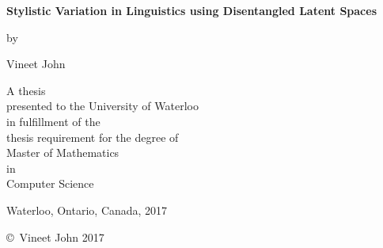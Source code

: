 \pagestyle{empty}

\begin{titlepage}
        \begin{center}
        \vspace*{1.0cm}

        \Huge
        {\bf Stylistic Variation in Linguistics using Disentangled Latent Spaces }

        \vspace*{1.0cm}

        \normalsize
        by \\

        \vspace*{1.0cm}

        \Large
        Vineet John \\

        \vspace*{3.0cm}

        \normalsize
        A thesis \\
        presented to the University of Waterloo \\ 
        in fulfillment of the \\
        thesis requirement for the degree of \\
        Master of Mathematics \\
        in \\
        Computer Science \\

        \vspace*{2.0cm}

        Waterloo, Ontario, Canada, 2017 \\

        \vspace*{1.0cm}

        \copyright\ Vineet John 2017 \\
        \end{center}
\end{titlepage}

\pagestyle{plain}
\setcounter{page}{2}


